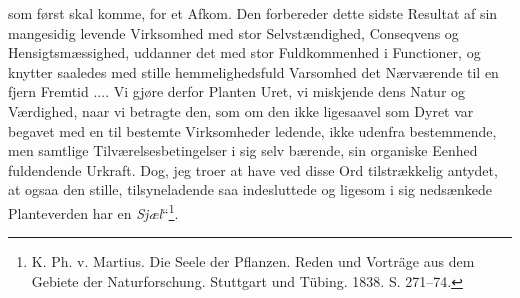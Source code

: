 \documentclass[11pt]{book}
\begin{document}
som først skal komme, for et Afkom. Den forbereder dette sidste Resultat af
sin mangesidig levende Virksomhed med stor Selvstændighed, Conseqvens og
Hensigtsmæssighed, uddanner det med stor Fuldkommenhed i Functioner, og
knytter saaledes med stille hemmelighedsfuld Varsomhed det Nærværende til en
fjern Fremtid .... Vi gjøre derfor Planten Uret, vi miskjende dens Natur og
Værdighed, naar vi betragte den, som om den ikke ligesaavel som Dyret var
begavet med en til bestemte Virksomheder ledende, ikke udenfra bestemmende,
men samtlige Tilværelsesbetingelser i sig selv bærende, sin organiske Eenhed
fuldendende Urkraft. Dog, jeg troer at have ved disse Ord tilstrækkelig
antydet, at ogsaa den stille, tilsyneladende saa indesluttede og ligesom i
sig nedsænkede Planteverden har en
\emph{Sjæl}“\footnote{%
K. Ph. v. Martius. Die Seele der Pflanzen. Reden und Vorträge aus dem Gebiete
der Naturforschung. Stuttgart und Tübing. 1838. S. 271--74.}.
\end{document}
